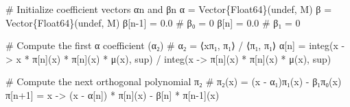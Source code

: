 \documentclass[
]{article}
\newenvironment{Shaded}{\begin{snugshade}}{\end{snugshade}}
\newcommand{\CommentTok}[1]{\textcolor[rgb]{0.37,0.37,0.37}{#1}}
\newcommand{\ConstantTok}[1]{\textcolor[rgb]{0.56,0.35,0.01}{#1}}
\newcommand{\DataTypeTok}[1]{\textcolor[rgb]{0.68,0.00,0.00}{#1}}
\newcommand{\FloatTok}[1]{\textcolor[rgb]{0.68,0.00,0.00}{#1}}
\newcommand{\FunctionTok}[1]{\textcolor[rgb]{0.28,0.35,0.67}{#1}}
\newcommand{\NormalTok}[1]{\textcolor[rgb]{0.00,0.23,0.31}{#1}}
\newcommand{\OperatorTok}[1]{\textcolor[rgb]{0.37,0.37,0.37}{#1}}
\begin{document}
\begin{Shaded}
\begin{Highlighting}[]
    \CommentTok{\# Initialize coefficient vectors αn and βn}
\NormalTok{    α }\OperatorTok{=} \FunctionTok{Vector}\DataTypeTok{\{Float64\}}\NormalTok{(}\ConstantTok{undef}\NormalTok{, M)}
\NormalTok{    β }\OperatorTok{=} \FunctionTok{Vector}\DataTypeTok{\{Float64\}}\NormalTok{(}\ConstantTok{undef}\NormalTok{, M)}
\NormalTok{    β[n}\OperatorTok{{-}}\FloatTok{1}\NormalTok{] }\OperatorTok{=} \FloatTok{0.0}  \CommentTok{\# β₀ = 0}
\NormalTok{    β[n] }\OperatorTok{=} \FloatTok{0.0}    \CommentTok{\# β₁ = 0}

    \CommentTok{\# Compute the first α coefficient (α₂)}
    \CommentTok{\# α₂ = ⟨xπ₁, π₁⟩ / ⟨π₁, π₁⟩}
\NormalTok{    α[n] }\OperatorTok{=} \FunctionTok{integ}\NormalTok{(x }\OperatorTok{{-}\textgreater{}}\NormalTok{ x }\OperatorTok{*} \ConstantTok{π}\NormalTok{[n](x) }\OperatorTok{*} \ConstantTok{π}\NormalTok{[n](x) }\OperatorTok{*} \FunctionTok{μ}\NormalTok{(x), sup) }\OperatorTok{/} \FunctionTok{integ}\NormalTok{(x }\OperatorTok{{-}\textgreater{}} \ConstantTok{π}\NormalTok{[n](x) }\OperatorTok{*} \ConstantTok{π}\NormalTok{[n](x) }\OperatorTok{*} \FunctionTok{μ}\NormalTok{(x), sup)}
    
    \CommentTok{\# Compute the next orthogonal polynomial π₂}
    \CommentTok{\# π₂(x) = (x {-} α₁)π₁(x) {-} β₁π₀(x)}
    \ConstantTok{π}\NormalTok{[n}\OperatorTok{+}\FloatTok{1}\NormalTok{] }\OperatorTok{=}\NormalTok{ x }\OperatorTok{{-}\textgreater{}}\NormalTok{ (x }\OperatorTok{{-}}\NormalTok{ α[n]) }\OperatorTok{*} \ConstantTok{π}\NormalTok{[n](x) }\OperatorTok{{-}}\NormalTok{ β[n] }\OperatorTok{*} \ConstantTok{π}\NormalTok{[n}\OperatorTok{{-}}\FloatTok{1}\NormalTok{](x)}


\end{Highlighting}
\end{Shaded}
\end{document}
